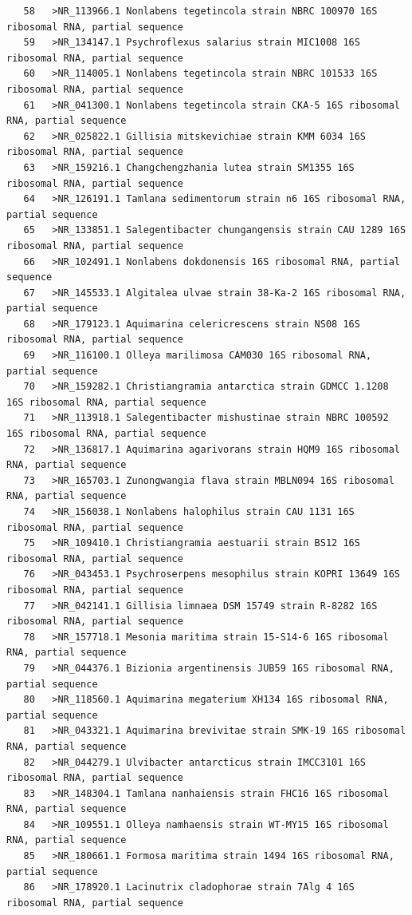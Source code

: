 \documentclass{article}
\begin{document}
\begin{verbatim}
   58	>NR_113966.1 Nonlabens tegetincola strain NBRC 100970 16S ribosomal RNA, partial sequence
   59	>NR_134147.1 Psychroflexus salarius strain MIC1008 16S ribosomal RNA, partial sequence
   60	>NR_114005.1 Nonlabens tegetincola strain NBRC 101533 16S ribosomal RNA, partial sequence
   61	>NR_041300.1 Nonlabens tegetincola strain CKA-5 16S ribosomal RNA, partial sequence
   62	>NR_025822.1 Gillisia mitskevichiae strain KMM 6034 16S ribosomal RNA, partial sequence
   63	>NR_159216.1 Changchengzhania lutea strain SM1355 16S ribosomal RNA, partial sequence
   64	>NR_126191.1 Tamlana sedimentorum strain n6 16S ribosomal RNA, partial sequence
   65	>NR_133851.1 Salegentibacter chungangensis strain CAU 1289 16S ribosomal RNA, partial sequence
   66	>NR_102491.1 Nonlabens dokdonensis 16S ribosomal RNA, partial sequence
   67	>NR_145533.1 Algitalea ulvae strain 38-Ka-2 16S ribosomal RNA, partial sequence
   68	>NR_179123.1 Aquimarina celericrescens strain NS08 16S ribosomal RNA, partial sequence
   69	>NR_116100.1 Olleya marilimosa CAM030 16S ribosomal RNA, partial sequence
   70	>NR_159282.1 Christiangramia antarctica strain GDMCC 1.1208 16S ribosomal RNA, partial sequence
   71	>NR_113918.1 Salegentibacter mishustinae strain NBRC 100592 16S ribosomal RNA, partial sequence
   72	>NR_136817.1 Aquimarina agarivorans strain HQM9 16S ribosomal RNA, partial sequence
   73	>NR_165703.1 Zunongwangia flava strain MBLN094 16S ribosomal RNA, partial sequence
   74	>NR_156038.1 Nonlabens halophilus strain CAU 1131 16S ribosomal RNA, partial sequence
   75	>NR_109410.1 Christiangramia aestuarii strain BS12 16S ribosomal RNA, partial sequence
   76	>NR_043453.1 Psychroserpens mesophilus strain KOPRI 13649 16S ribosomal RNA, partial sequence
   77	>NR_042141.1 Gillisia limnaea DSM 15749 strain R-8282 16S ribosomal RNA, partial sequence
   78	>NR_157718.1 Mesonia maritima strain 15-S14-6 16S ribosomal RNA, partial sequence
   79	>NR_044376.1 Bizionia argentinensis JUB59 16S ribosomal RNA, partial sequence
   80	>NR_118560.1 Aquimarina megaterium XH134 16S ribosomal RNA, partial sequence
   81	>NR_043321.1 Aquimarina brevivitae strain SMK-19 16S ribosomal RNA, partial sequence
   82	>NR_044279.1 Ulvibacter antarcticus strain IMCC3101 16S ribosomal RNA, partial sequence
   83	>NR_148304.1 Tamlana nanhaiensis strain FHC16 16S ribosomal RNA, partial sequence
   84	>NR_109551.1 Olleya namhaensis strain WT-MY15 16S ribosomal RNA, partial sequence
   85	>NR_180661.1 Formosa maritima strain 1494 16S ribosomal RNA, partial sequence
   86	>NR_178920.1 Lacinutrix cladophorae strain 7Alg 4 16S ribosomal RNA, partial sequence

\end{verbatim}
\end{document}
